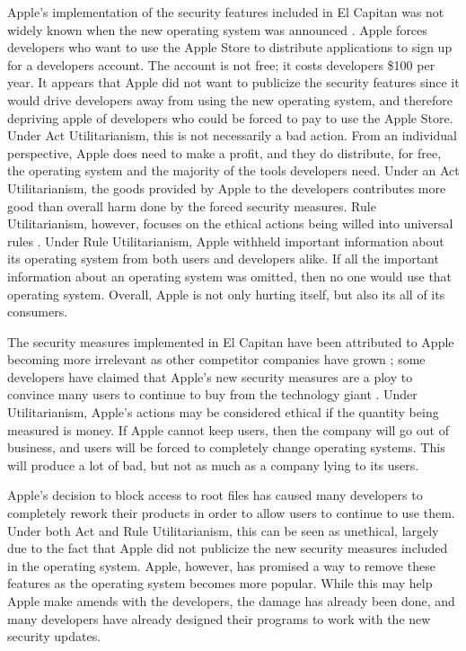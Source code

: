 \documentclass{paper}
\begin{document}
\begin{linenumbers}
Apple's implementation of the security features included in El Capitan was not widely known when the new operating system was announced \cite{sec}. Apple forces developers who want to use the Apple Store to distribute applications to sign up for a developers account. The account is not free; it costs developers \$100 per year. It appears that Apple did not want to publicize the security features since it would drive developers away from using the new operating system, and therefore depriving apple of developers who could be forced to pay to use the Apple Store. Under Act Utilitarianism, this is not necessarily a bad action. From an individual perspective, Apple does need to make a profit, and they do distribute, for free, the operating system and the majority of the tools developers need. Under an Act Utilitarianism, the goods provided by Apple to the developers contributes more good than overall harm done by the forced security measures. Rule Utilitarianism, however, focuses on the ethical actions being willed into universal rules \cite[75]{Ethics}. Under Rule Utilitarianism, Apple withheld important information about its operating system from both users and developers alike. If all the important information about an operating system was omitted, then no one would use that operating system. Overall, Apple is not only hurting itself, but also its all of its consumers.

The security measures implemented in El Capitan have been attributed to Apple becoming more irrelevant as other competitor companies have grown \cite{guard}; some developers have claimed that Apple's new security measures are a ploy to convince many users to continue to buy from the technology giant \cite{verge}. Under Utilitarianism, Apple's actions may be considered ethical if the quantity being measured is money. If Apple cannot keep users, then the company will go out of business, and users will be forced to completely change operating systems. This will produce a lot of bad, but not as much as a company lying to its users.

Apple's decision to block access to root files has caused many developers to completely rework their products in order to allow users to continue to use them. Under both Act and Rule Utilitarianism, this can be seen as unethical, largely due to the fact that Apple did not publicize the new security measures included in the operating system. Apple, however, has promised a way to remove these features as the operating system becomes more popular. While this may help Apple make amends with the developers, the damage has already been done, and many developers have already designed their programs to work with the new security updates.

\end{linenumbers}
\newpage

\printbibliography
\end{document}
